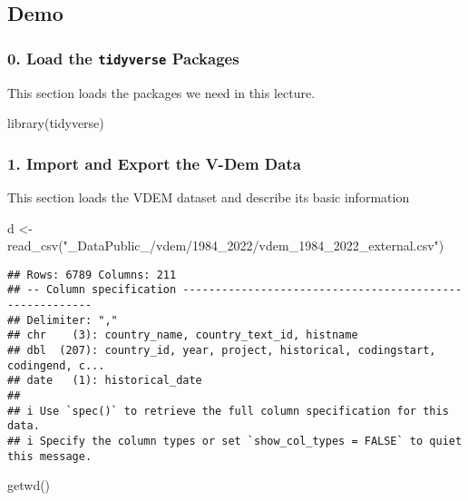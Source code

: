 \documentclass[
]{article}
\newenvironment{Shaded}{\begin{snugshade}}{\end{snugshade}}
\newcommand{\FunctionTok}[1]{\textcolor[rgb]{0.00,0.00,0.00}{#1}}
\newcommand{\NormalTok}[1]{#1}
\newcommand{\OtherTok}[1]{\textcolor[rgb]{0.56,0.35,0.01}{#1}}
\newcommand{\StringTok}[1]{\textcolor[rgb]{0.31,0.60,0.02}{#1}}
\begin{document}
\hypertarget{demo}{%
\subsection{Demo}\label{demo}}

\hypertarget{load-the-tidyverse-packages}{%
\subsubsection{\texorpdfstring{0. Load the \texttt{tidyverse}
Packages}{0. Load the tidyverse Packages}}\label{load-the-tidyverse-packages}}

This section loads the packages we need in this lecture.

\begin{Shaded}
\begin{Highlighting}[]
\FunctionTok{library}\NormalTok{(tidyverse)}
\end{Highlighting}
\end{Shaded}

\hypertarget{import-and-export-the-v-dem-data}{%
\subsubsection{1. Import and Export the V-Dem
Data}\label{import-and-export-the-v-dem-data}}

This section loads the VDEM dataset and describe its basic information

\begin{Shaded}
\begin{Highlighting}[]
\NormalTok{d }\OtherTok{\textless{}{-}} \FunctionTok{read\_csv}\NormalTok{(}\StringTok{"\_DataPublic\_/vdem/1984\_2022/vdem\_1984\_2022\_external.csv"}\NormalTok{)}
\end{Highlighting}
\end{Shaded}

\begin{verbatim}
## Rows: 6789 Columns: 211
## -- Column specification --------------------------------------------------------
## Delimiter: ","
## chr    (3): country_name, country_text_id, histname
## dbl  (207): country_id, year, project, historical, codingstart, codingend, c...
## date   (1): historical_date
## 
## i Use `spec()` to retrieve the full column specification for this data.
## i Specify the column types or set `show_col_types = FALSE` to quiet this message.
\end{verbatim}

\begin{Shaded}
\begin{Highlighting}[]
\FunctionTok{getwd}\NormalTok{()}
\end{Highlighting}
\end{Shaded}
\end{document}
